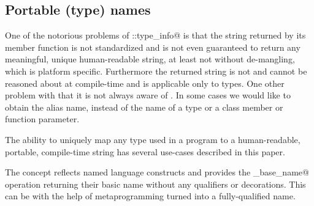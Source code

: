 \subsection{Portable (type) names}

One of the notorious problems of \verb@std::type_info@ is that the string
returned by its \verb@name@ member function is not standardized and is
not even guaranteed to return any meaningful, unique human-readable string,
at least not without de-mangling, which is platform specific.
Furthermore the returned string is not \verb@constexpr@ and cannot be
reasoned about at compile-time and is applicable only to types.
One other problem with \verb@typeid@ that it is not always aware of \verb@typedef@s.
In some cases we would like to obtain the alias name, instead of the
 name of a type or a class member or function parameter.

The ability to uniquely map any type used in a program to a human-readable,
portable, compile-time string has several use-cases described in this paper.

The  concept reflects named language constructs
and provides the \verb@get_base_name@ operation
returning their basic name without any qualifiers or decorations.
This can be with the help of metaprogramming turned into a fully-qualified
name.


